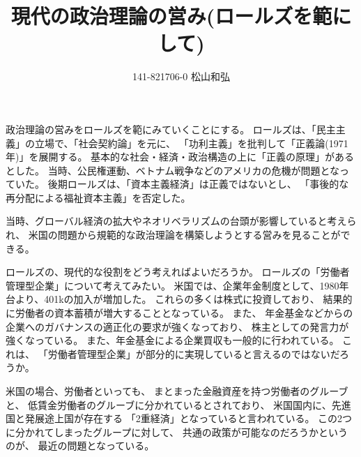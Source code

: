 \documentclass{jsarticle}
\begin{document}
\title{現代の政治理論の営み(ロールズを範にして)}
\author{141-821706-0 松山和弘}
\maketitle




政治理論の営みをロールズを範にみていくことにする。
ロールズは、「民主主義」の立場で、「社会契約論」を元に、
「功利主義」を批判して「正義論(1971年)」を展開する。
基本的な社会・経済・政治構造の上に「正義の原理」があるとした。
当時、公民権運動、ベトナム戦争などのアメリカの危機が問題となっていた。
後期ロールズは、「資本主義経済」は正義ではないとし、
「事後的な再分配による福祉資本主義」を否定した。

当時、グローバル経済の拡大やネオリベラリズムの台頭が影響していると考えられ、
米国の問題から規範的な政治理論を構築しようとする営みを見ることができる。

ロールズの、現代的な役割をどう考えればよいだろうか。
ロールズの「労働者管理型企業」について考えてみたい。
米国では、企業年金制度として、1980年台より、401kの加入が増加した。
これらの多くは株式に投資しており、
結果的に労働者の資本蓄積が増大することとなっている。
また、
年金基金などからの企業へのガバナンスの適正化の要求が強くなっており、
株主としての発言力が強くなっている。
また、年金基金による企業買収も一般的に行われている。
これは、
「労働者管理型企業」が部分的に実現していると言えるのではないだろうか。

米国の場合、労働者といっても、
まとまった金融資産を持つ労働者のグルーブと、
低賃金労働者のグルーブに分かれているとされており、
米国国内に、先進国と発展途上国が存在する
「2重経済」となっていると言われている。
この2つに分かれてしまったグループに対して、
共通の政策が可能なのだろうかというのが、
最近の問題となっている。
\end{document}
